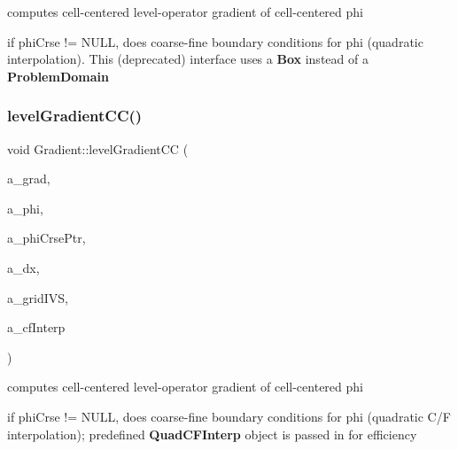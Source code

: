 computes cell-\/centered level-\/operator gradient of cell-\/centered phi 

if phi\+Crse != N\+U\+LL, does coarse-\/fine boundary conditions for phi (quadratic interpolation). This (deprecated) interface uses a \textbf{ Box} instead of a \textbf{ Problem\+Domain} \mbox{\label{class_gradient_a6a14b8f09f7882545497dcccac01e35e}} 
\subsubsection{\texorpdfstring{level\+Gradient\+C\+C()}{levelGradientCC()}\hspace{0.1cm}{\footnotesize\ttfamily [3/6]}}
{\footnotesize\ttfamily void Gradient\+::level\+Gradient\+CC (\begin{DoxyParamCaption}\item[{\textbf{ Level\+Data}$<$ \textbf{ F\+Array\+Box} $>$ \&}]{a\+\_\+grad,  }\item[{\textbf{ Level\+Data}$<$ \textbf{ F\+Array\+Box} $>$ \&}]{a\+\_\+phi,  }\item[{const \textbf{ Level\+Data}$<$ \textbf{ F\+Array\+Box} $>$ $\ast$}]{a\+\_\+phi\+Crse\+Ptr,  }\item[{const \textbf{ Real}}]{a\+\_\+dx,  }\item[{const \textbf{ Layout\+Data}$<$ \textbf{ Int\+Vect\+Set} $>$ \&}]{a\+\_\+grid\+I\+VS,  }\item[{\textbf{ Quad\+C\+F\+Interp} \&}]{a\+\_\+cf\+Interp }\end{DoxyParamCaption})\hspace{0.3cm}{\ttfamily [static]}}



computes cell-\/centered level-\/operator gradient of cell-\/centered phi 

if phi\+Crse != N\+U\+LL, does coarse-\/fine boundary conditions for phi (quadratic C/F interpolation); predefined \textbf{ Quad\+C\+F\+Interp} object is passed in for efficiency \mbox{\label{class_gradient_a6103f7090b4d658cc1086f31a47474ba}} 
